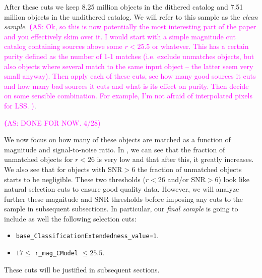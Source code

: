 \documentclass[twocolumn]{aastex62}
\newcommand{\as}[1]{{\textcolor{magenta}{{\textbf (AS: #1)}}}}
\begin{document}
After these cuts we keep 8.25 million objects in the dithered catalog and 7.51 million objects in the undithered catalog. We will refer to this sample as the \textit{clean sample}. \as{Ok, so this is now potentially the most interesting part of the paper and you effectively skim over it. I would start with a simple magnitude cut catalog containing sources above some $r<25.5$ or whatever. This has a certain purity defined as the number of 1-1 matches (i.e. exclude unmatches objects, but also objects where several match to the same input object -- the latter seem very small anyway). Then apply each of these cuts, see how many good sources it cuts and how many bad sources it cuts and what is its effect on purity. Then decide on some sensible combination. For example, I'm not afraid of interpolated pixels for LSS.
}. 

\as{DONE FOR NOW. 4/28}


We now focus on how many of these objects are matched as a function of magnitude and signal-to-noise ratio. In , we can see that the fraction of unmatched objects for $r < 26$ is very low and that after this, it greatly increases. We also see that for objects with SNR$>6$ the fraction of unmatched objects starts to be negligible. These two thresholds ($r < 26$ and/or SNR$>6$) look like natural selection cuts to ensure good quality data. However, we will analyze further these magnitude and SNR thresholds before imposing any cuts to the sample in subsequent subsections. In particular, our \textit{final sample} is going to include as well the following selection cuts:

\begin{itemize}
\item \texttt{base\_ClassificationExtendedness\_value=1}.
\item $17 \leq$ \texttt{r\_mag\_CModel} $\leq 25.5$. 
\end{itemize}

These cuts will be justified in subsequent sections.
\end{document}
